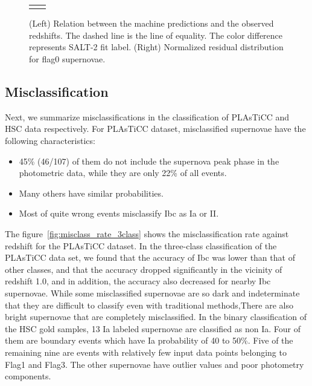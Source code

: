 \documentclass[useamsfonts]{pasj01}
\begin{document}
\begin{figure}[ht]
\begin{tabular}{cc}
\begin{minipage}{0.5\hsize}
\begin{center}
            \end{center}
        \end{minipage}
    \end{tabular}  \caption{%
    (Left) Relation between the machine predictions and the observed redshifts.
    The dashed line is the line of equality.
    The color difference represents SALT-2 fit label.
    (Right) Normalized residual distribution for flag0 supernovae.
    }%
    \label{fig:redshift_estimation}
\end{figure}
%
%
\subsection{Misclassification}
\label{sec:misclass}
%
Next, we summarize misclassifications in the classification of PLAsTiCC and HSC data respectively.
For PLAsTiCC dataset, misclassified supernovae have the following characteristics:
\begin{itemize}
\item 45\% (46/107) of them do not include the supernova peak phase in the photometric data, while they are only 22\% of all events.
\item Many others have similar probabilities.
\item Most of quite wrong events misclassify Ibc as Ia or II.
\end{itemize}
The figure\ \ref{fig:misclass_rate_3class} shows the misclassification rate against redshift for the PLAsTiCC dataset.
In the three-class classification of the PLAsTiCC data set, we found that the accuracy of Ibc was lower than that of other classes, and that the accuracy dropped significantly in the vicinity of redshift 1.0, and in addition, the accuracy also decreased for nearby Ibc supernovae.
While some misclassified supernovae are so dark and indeterminate that they are difficult to classify even with traditional methods,There are also bright supernovae that are completely misclassified.
In the binary classification of the HSC gold samples, 13 Ia labeled supernovae are classified as non Ia.
Four of them are boundary events which have Ia probability of 40 to 50\%.
Five of the remaining nine are events with relatively few input data points belonging to Flag1 and Flag3.
The other supernovae have outlier values and poor photometry components.
%
\end{document}
